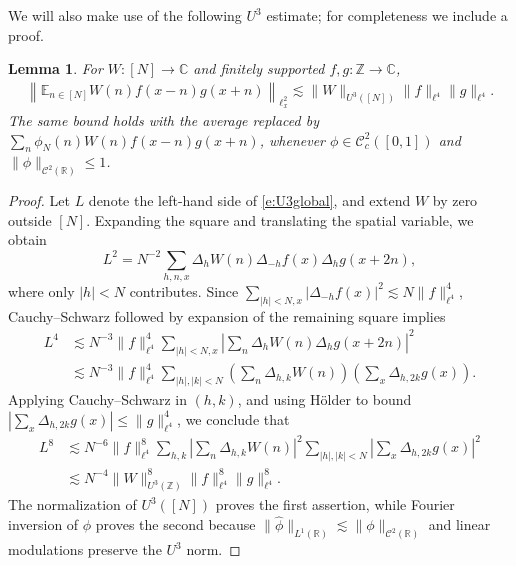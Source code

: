 \documentclass[12pt,leqno]{amsart}
\numberwithin{equation}{section}
\newtheorem{lemma}[equation]{Lemma}
\theoremstyle{definition}
\theoremstyle{plain}
\begin{document}
	We will also make use of the following $U^3$ estimate; for completeness we include a proof.
	\begin{lemma}\label{l:U3maxmod}
		For $W:[N]\to\mathbb C$ and finitely supported $f,g:\mathbb Z\to\mathbb C$,
		\begin{align}\label{e:U3global}
			\left\|\mathbb E_{n\in[N]}W(n)f(x-n)g(x+n)\right\|_{\ell^2_x}
			\lesssim \|W\|_{U^3([N])}\|f\|_{\ell^4}\|g\|_{\ell^4}.
		\end{align}
		The same bound holds with the average replaced by
		$\sum_n\phi_N(n)W(n)f(x-n)g(x+n)$, whenever
		$\phi\in\mathcal C_c^2([0,1])$ and
		$\|\phi\|_{\mathcal C^2(\mathbb R)}\leq1$.
	\end{lemma}
	\begin{proof}
		Let $L$ denote the left-hand side of \eqref{e:U3global}, and extend
		$W$ by zero outside $[N]$.
		Expanding the square and translating the spatial variable, we obtain
		\[
		L^2=N^{-2}\sum_{h,n,x}
		\Delta_hW(n)\Delta_{-h}f(x)\Delta_hg(x+2n),
		\]
		where only $|h|<N$ contributes.
		Since $\sum_{|h|<N,x}|\Delta_{-h}f(x)|^2\lesssim
		N\|f\|_{\ell^4}^4$, Cauchy--Schwarz followed by expansion of the
		remaining square implies
		\begin{align*}
			L^4
			&\lesssim N^{-3}\|f\|_{\ell^4}^4
			\sum_{|h|<N,x}\left|\sum_n\Delta_hW(n)\Delta_hg(x+2n)\right|^2\\
			&\lesssim N^{-3}\|f\|_{\ell^4}^4
			\sum_{|h|,|k|<N}
			\left(\sum_n\Delta_{h,k}W(n)\right)
			\left(\sum_x\Delta_{h,2k}g(x)\right).
		\end{align*}
		Applying Cauchy--Schwarz in $(h,k)$, and using H\"older to bound
		$|\sum_x\Delta_{h,2k}g(x)|\leq\|g\|_{\ell^4}^4$, we conclude that
		\begin{align*}
			L^8
			&\lesssim N^{-6}\|f\|_{\ell^4}^8
			\sum_{h,k}\left|\sum_n\Delta_{h,k}W(n)\right|^2
			\sum_{|h|,|k|<N}\left|\sum_x\Delta_{h,2k}g(x)\right|^2\\
			&\lesssim N^{-4}\|W\|_{U^3(\mathbb Z)}^8
			\|f\|_{\ell^4}^8\|g\|_{\ell^4}^8.
		\end{align*}
		The normalization of $U^3([N])$ proves the first assertion, while
		Fourier inversion of $\phi$ proves the second because
		$\|\widehat\phi\|_{L^1(\mathbb R)}\lesssim\|\phi\|_{\mathcal C^2(\mathbb{R})}$
		and linear modulations preserve the $U^3$ norm.
	\end{proof}
	
	
\end{document}
